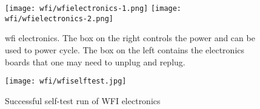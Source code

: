 \documentclass[11pt,fleqn,a4paper]{book}
\begin{document}
\begin{figure}[ht]
    \centering
	\texttt{[image: wfi/wfielectronics-1.png]}
	\linewidth
	\texttt{[image: wfi/wfielectronics-2.png]}
	\caption[WFI electronics: power cycle button and boards]{\gls{wfi} electronics.  The box on the right controls the power and can be used to \gls{power cycle}. The box on the left contains the electronics boards that one may need to unplug and replug.}
	\label{fig:wfielectronics}
\end{figure}

\begin{figure}
    \centering
    \texttt{[image: wfi/wfiselftest.jpg]}
    \caption{Successful self-test run of WFI electronics}
    \label{fig:wfiselftest}
\end{figure}
\end{document}
